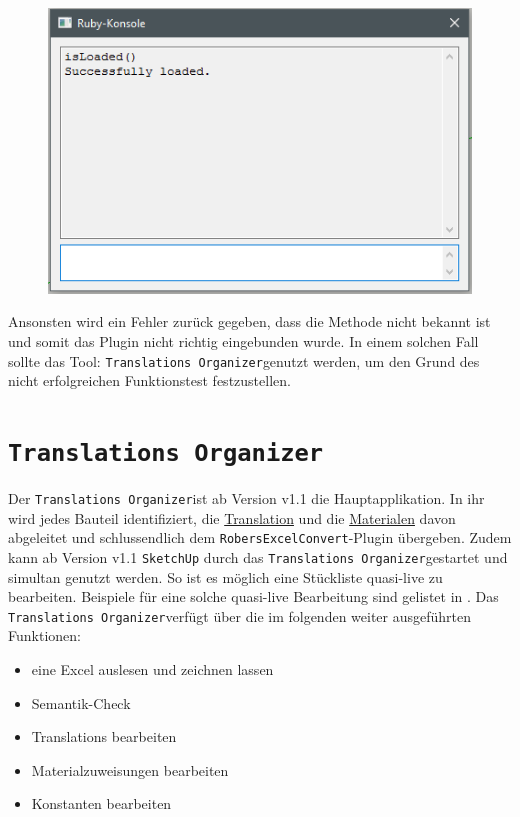 \documentclass{book}
\newcommand{\sketchup}{\texttt{SketchUp}\xspace}
\newcommand{\robersexcelconvert}{\texttt{RobersExcelConvert}\xspace}
\newcommand{\assisttool}{\texttt{Translations Organizer}}
\begin{document}
			\begin{figure}[H]
				\centering
				\includegraphics[scale=0.6]{pics/funktionstest.png}
				\label{funktionstest-success}
			\end{figure}
			
			Ansonsten wird ein Fehler zurück gegeben, dass die Methode nicht bekannt ist und somit das Plugin nicht richtig eingebunden wurde. In einem solchen Fall sollte das Tool: \assisttool genutzt werden, um den Grund des nicht erfolgreichen Funktionstest festzustellen.
	\chapter{\assisttool}\label{assisttool}
		Der \assisttool ist ab Version v1.1 die Hauptapplikation. In ihr wird jedes Bauteil identifiziert, die \hyperref[Translation]{Translation} und die \hyperref[Material]{Materialen} davon abgeleitet und schlussendlich dem \robersexcelconvert-Plugin übergeben. Zudem kann ab Version v1.1 \sketchup durch das \assisttool gestartet und simultan genutzt werden. So ist es möglich eine Stückliste quasi-live zu bearbeiten. Beispiele für eine solche quasi-live Bearbeitung sind gelistet in %
		. Das \assisttool verfügt über die im folgenden weiter ausgeführten Funktionen:
			\begin{itemize}
				\item eine Excel auslesen und zeichnen lassen
				\item Semantik-Check
				\item Translations bearbeiten
				\item Materialzuweisungen bearbeiten
				\item Konstanten bearbeiten
			\end{itemize}
\end{document}
